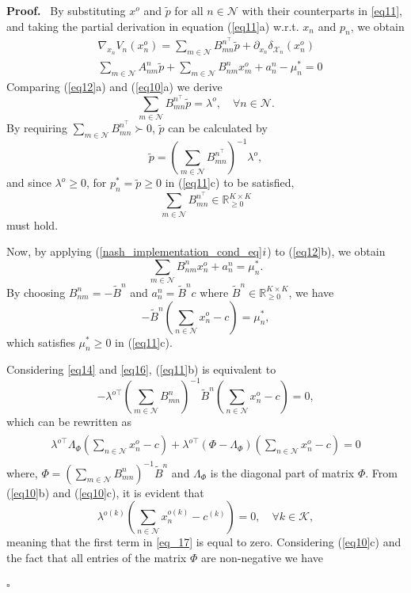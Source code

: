 \documentclass[twocolumn]{autart}
\newenvironment{proof}[1][Proof]{%
  \par\noindent\textbf{#1.}\ }{%
  \hfill$\square$\par
}
\begin{document}
\begin{proof}
 By substituting $x^o$ and $\tilde{p}$ for all $n\in\mathcal{N}$ with their counterparts in \eqref{eq11}, and taking the partial derivation in equation (\ref{eq11}a)  w.r.t. $x_n$ and $p_n$, we obtain
		\begin{subequations}\label{eq12}
			\begin{align}
				&\nabla_{x_n}V_n(x_n^o)=\sum_{m\in\mathcal{N}}{B_{mn}^{n^\top}\tilde{p}}+\partial_{x_n} \delta_{\mathcal{X}_n}(x_n^o)\\
				&\sum_{m\in\mathcal{N}}{A_{nm}^{n}\tilde{p}}+\sum_{m\in\mathcal{N}}{B_{nm}^nx_m^o}+a_n^{n}-\mu_n^*=0
			\end{align}		
		\end{subequations}
Comparing (\ref{eq12}a) and (\ref{eq10}a) we derive
    \begin{equation}\label{eq13}
    \sum_{m\in\mathcal{N}}{B_{mn}^{n^\top}\tilde{p}}=\lambda^o, \quad \forall n\in\mathcal{N}.
    \end{equation}
    By requiring $\sum_{m\in\mathcal{N}}{B_{mn}^{n^\top}}\succ 0$, $\tilde{p}$ can be calculated by 
  \begin{equation}\label{eq14}
      \tilde{p}=(\sum_{m\in\mathcal{N}}{B_{mn}^{n^\top}})^{-1}\lambda^o,
  \end{equation}
  and since $\lambda^o\geq 0$, for $p_n^{*}=\tilde{p}\geq 0$ in (\ref{eq11}c) to be satisfied, \[\sum_{m\in\mathcal{N}}{B_{mn}^{n^\top}}\in\mathbb{R}_{\geq 0}^{K\times K}\] must hold.
		
  Now, by applying (\ref{nash_implementation_cond_eq}$\romannumeral 1$) to (\ref{eq12}b), we obtain \[\sum_{m\in\mathcal{N}}{B_{nm}^n}x_n^o+a_n^{n}=\mu_n^*.\]
  By choosing $B_{nm}^n=-\tilde{B}^n$ and $a_n^n=\tilde{B}^n c$ where $\tilde{B}^n\in\mathbb{R}_{\geq 0}^{K\times K}$, we have
  \begin{equation}\label{eq16}
      -\tilde{B}^n(\sum_{n\in\mathcal{N}}{x_n^o}-c)=\mu_n^*,
  \end{equation} 
  which satisfies $\mu_n^{*}\geq 0$ in (\ref{eq11}c). 

 Considering \eqref{eq14} and \eqref{eq16}, (\ref{eq11}b) is equivalent to \[-\lambda^{o\top}(\sum_{m\in\mathcal{N}}{B_{mn}^{n}})^{-1}\tilde{B}^n(\sum_{n\in\mathcal{N}}{x_n^o}-c)=0,\] which can be rewritten as
\begin{equation}\label{eq_17}
\begin{aligned}
    \begin{split}
        \lambda^{o\top}\Lambda_\Phi(\sum_{n\in\mathcal{N}}{x_n^o}-c) + \lambda^{o\top}(\Phi-\Lambda_\Phi)(\sum_{n\in\mathcal{N}}{x_n^o}-c)=0
    \end{split}
\end{aligned}
\end{equation}
where, $\Phi=(\sum_{m\in\mathcal{N}}{B_{mn}^{n}})^{-1}\tilde{B}^n$ and $\Lambda_\Phi$ is the diagonal part of matrix $\Phi$. From (\ref{eq10}b) and (\ref{eq10}c), it is evident that \[\lambda^{o(k)}(\sum_{n\in\mathcal{N}}{x_n^{o(k)}}-c^{(k)})=0,\quad \forall k\in\mathcal{K},\] meaning that the first term in \eqref{eq_17} is equal to zero. Considering (\ref{eq10}c) and the fact that all entries of the matrix $\Phi$ are non-negative we have


\end{proof}
\end{document}
